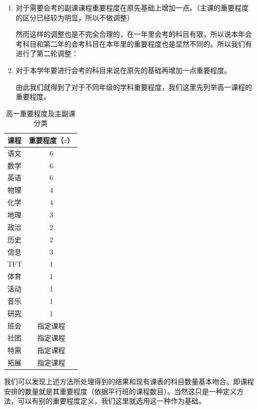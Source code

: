 \documentclass[a4paper]{article}
\begin{document}
   \begin{enumerate}

   \item 对于需要会考的副课课程重要程度在原先基础上增加一点。（主课的重要程度的区分已经较为明显，所以不做调整）

   然而这样的调整也是不完全合理的，在一年里会考的科目有限，所以说本年会考科目和第二年的会考科目在本年里的重要程度也是显然不同的。所以我们有进行了第二轮调整：

   \item 对于本学年要进行会考的科目来说在原先的基础再增加一点重要程度。

   由此我们就得到了对于不同年级的学科重要程度，我们这里先列举高一课程的重要程度。

   \end{enumerate}

   \begin{table}[H]
   \centering
   \begin{tabular}{lc}
   \toprule
   \bf 课程 & \bf 重要程度（$z$）\\
   \midrule
   语文 & 6 \\
   数学 & 6 \\
   英语 & 6 \\
   物理 & 4 \\
   化学 & 4 \\
   地理 & 3 \\
   政治 & 2 \\
   历史 & 2 \\
   信息 & 3 \\
   TFT  & 1 \\
   体育 & 1 \\
   活动 & 1 \\
   音乐 & 1 \\
   研究 & 1 \\
   班会 & 指定课程 \\
   社团 & 指定课程 \\
   特需 & 指定课程 \\
   拓展 & 指定课程 \\
   \bottomrule
   \end{tabular}
   \caption{高一重要程度及主副课分类}
   \end{table}

   我们可以发现上述方法所处理得到的结果和现有课表的科目数量基本吻合。即课程安排的数量就是其重要程度（依据平行班的课程数目）。当然这只是一种定义方法，可以有别的重要程度定义，我们这里就选用这一种作为基础。

\clearpage
\end{document}
